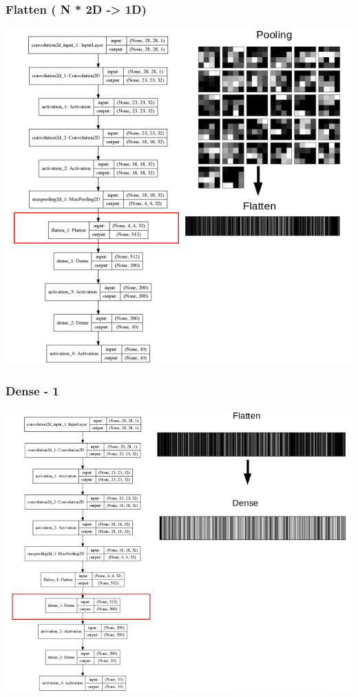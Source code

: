 \documentclass[tikz,11pt]{beamer}
\begin{document}
\begin{frame}
	\frametitle{Flatten ( N * 2D -> 1D)}
	\centering
	\includegraphics[height=.8\paperheight]{images/fabio/flatten_1}
\end{frame}


\begin{frame}
	\frametitle{Dense - 1}
	\centering
	\includegraphics[height=.8\paperheight]{images/fabio/dense1}
\end{frame}
\end{document}

